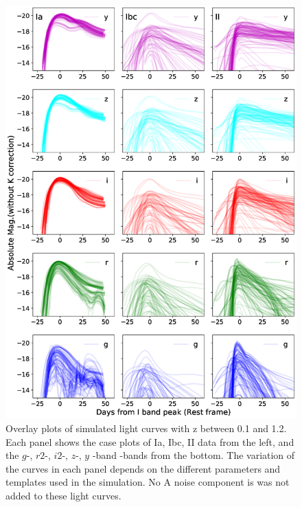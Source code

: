 \documentclass[proof]{pasj01}
\providecommand{\DIFadd}[1]{{\protect\color{blue} \sf #1}} %
\providecommand{\DIFdel}[1]{{\protect\color{red} \scriptsize #1}} %
\providecommand{\DIFaddFL}[1]{\DIFadd{#1}} %
\providecommand{\DIFdelFL}[1]{\DIFdel{#1}} %
\providecommand{\DIFaddbeginFL}{} %
\providecommand{\DIFaddendFL}{} %
\providecommand{\DIFdelbeginFL}{} %
\providecommand{\DIFdelendFL}{} %
\newcommand{\DIFscaledelfig}{0.5}
\newlength{\DIFdelgraphicswidth} %
\newlength{\DIFdelgraphicsheight} %
\newcommand{\DIFaddincludegraphics}[2][]{{\color{blue}\fbox{\DIFOincludegraphics[#1]{#2}}}} %
\newcommand{\DIFdelincludegraphics}[2][]{%
\sbox{\DIFdelgraphicsbox}{\DIFOincludegraphics[#1]{#2}}%
\settoboxwidth{\DIFdelgraphicswidth}{\DIFdelgraphicsbox} %
\settoboxtotalheight{\DIFdelgraphicsheight}{\DIFdelgraphicsbox} %
\scalebox{\DIFscaledelfig}{%
\parbox[b]{\DIFdelgraphicswidth}{\usebox{\DIFdelgraphicsbox}\\[-\baselineskip] \rule{\DIFdelgraphicswidth}{0em}}\llap{\resizebox{\DIFdelgraphicswidth}{\DIFdelgraphicsheight}{%
\setlength{\unitlength}{\DIFdelgraphicswidth}%
\begin{picture}(1,1)%
\thicklines\linethickness{2pt} %
{\color[rgb]{1,0,0}\put(0,0){\framebox(1,1){}}}%
{\color[rgb]{1,0,0}\put(0,0){\line( 1,1){1}}}%
{\color[rgb]{1,0,0}\put(0,1){\line(1,-1){1}}}%
\end{picture}%
}\hspace*{3pt}}} %
} %
\DeclareRobustCommand{\DIFaddbeginFL}{\DIFOaddbeginFL \let\includegraphics\DIFaddincludegraphics} %
\DeclareRobustCommand{\DIFaddendFL}{\DIFOaddendFL \let\includegraphics\DIFOincludegraphics} %
\DeclareRobustCommand{\DIFdelbeginFL}{\DIFOdelbeginFL \let\includegraphics\DIFdelincludegraphics} %
\DeclareRobustCommand{\DIFdelendFL}{\DIFOaddendFL \let\includegraphics\DIFOincludegraphics} %
\begin{document}
\begin{figure}[htbp]
  \begin{center}
    \includegraphics[width=130mm]{figures/SimLCsamples.eps}
  \end{center}
  \vspace{-6mm}
  \caption{%
  Overlay plots of simulated light curves with z between 0.1 and 1.2.
  Each panel shows the \DIFdelbeginFL \DIFdelFL{case }\DIFdelendFL \DIFaddbeginFL \DIFaddFL{plots }\DIFaddendFL of Ia, Ibc, II \DIFaddbeginFL \DIFaddFL{data }\DIFaddendFL from the left, and \DIFaddbeginFL \DIFaddFL{the }\DIFaddendFL $g$-, $r2$-, $i2$-, $z$-, $y$\DIFdelbeginFL \DIFdelFL{-band }\DIFdelendFL \DIFaddbeginFL \DIFaddFL{-bands }\DIFaddendFL from the bottom.
  The variation of the curves in each panel depends on the different parameters and templates used in the simulation.
  \DIFdelbeginFL \DIFdelFL{No }\DIFdelendFL \DIFaddbeginFL \DIFaddFL{A }\DIFaddendFL noise component \DIFdelbeginFL \DIFdelFL{is }\DIFdelendFL \DIFaddbeginFL \DIFaddFL{was not }\DIFaddendFL added to these light curves.
  }%

  \label{fig:simLCsamples}
\end{figure}
\end{document}

